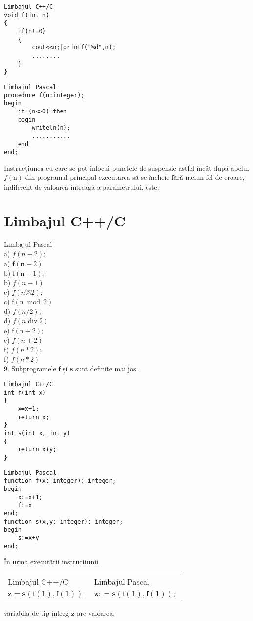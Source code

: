 \begin{verbatim}
Limbajul C++/C
void f(int n)
{
    if(n!=0)
    {
        cout<<n;|printf("%d",n);
        ........
    }
}
\end{verbatim}

\begin{verbatim}
Limbajul Pascal
procedure f(n:integer);
begin
    if (n<>0) then
    begin
        writeln(n);
        ...........
    end
end;
\end{verbatim}

Instrucțiunea cu care se pot înlocui punctele de suspensie astfel încât după apelul $f(\mathrm{n})$ din programul principal executarea să se încheie fără niciun fel de eroare, indiferent de valoarea întreagă a parametrului, este:

\section*{Limbajul C++/C}
Limbajul Pascal\\
a) $f(n-2)$;\\
a) $\mathbf{f}(\mathbf{n}-2)$\\
b) $\mathrm{f}(\mathrm{n}-1)$;\\
b) $f(n-1)$\\
c) $f(n \% 2)$;\\
c) $\mathrm{f}(\mathrm{n} \bmod 2)$\\
d) $f(n / 2)$;\\
d) $f(n \operatorname{div} 2)$\\
e) $\mathrm{f}(\mathrm{n}+2)$;\\
e) $f(n+2)$\\
f) $f(n * 2)$;\\
f) $f(n * 2)$\\
9. Subprogramele $\mathbf{f}$ și $\mathbf{s}$ sunt definite mai jos.

\begin{verbatim}
Limbajul C++/C
int f(int x)
{
    x=x+1;
    return x;
}
int s(int x, int y)
{
    return x+y;
}
\end{verbatim}

\begin{verbatim}
Limbajul Pascal
function f(x: integer): integer;
begin
    x:=x+1;
    f:=x
end;
function s(x,y: integer): integer;
begin
    s:=x+y
end;
\end{verbatim}

În urma executării instrucțiunii

\begin{center}
\begin{tabular}{l|l}
Limbajul C++/C & Limbajul Pascal \\
$\mathbf{z = s}(\mathrm{f}(1), \mathrm{f}(1)) ;$ & $\mathbf{z : = s}(\mathrm{f}(1), \mathbf{f}(1)) ;$ \\
\end{tabular}
\end{center} variabila de tip întreg $\mathbf{z}$ are valoarea:

